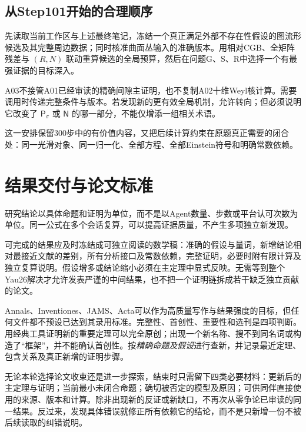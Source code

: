 \documentclass[UTF8,a4paper,11pt,fontset=fandol]{ctexart}
\numberwithin{equation}{section}
\theoremstyle{definition}
\begin{document}
\subsection{从Step101开始的合理顺序}
先读取当前工作区与上述最终笔记，冻结一个真正满足外部不存在性假设的图流形候选及其完整周边数据；同时核准曲面丛输入的准确版本。用相对CGB、全矩阵残差与 $(R,N)$ 联动重算候选的全局预算，然后在问题G、S、R中选择一个有最强证据的目标深入。

A03不接管A01已经审读的精确间隙主证明，也不复制A02十维Weyl核计算。需要调用时传递完整条件与版本。若发现新的更有效全局机制，允许转向；但必须说明它改变了 $\mathsf P_\sigma$ 或 $\mathsf N$ 的哪一部分，不能仅增添一组相关术语。

这一安排保留300步中的有价值内容，又把后续计算约束在原题真正需要的闭合处：同一光滑对象、同一归一化、全部方程、全部Einstein符号和明确常数依赖。

\section{结果交付与论文标准}
研究结论以具体命题和证明为单位，而不是以Agent数量、步数或平台认可次数为单位。同一公式在多个会话复算，可以提高证据质量，不产生多项独立新发现。

可完成的结果应及时冻结成可独立阅读的数学稿：准确的假设与量词，新增结论相对最接近文献的差别，所有分析接口及常数依赖，完整证明，必要时附有限计算及独立复算说明。假设增多或结论缩小必须在主定理中显式反映。无需等到整个Yau26解决才允许发表严谨的中间结果，也不把一个证明链拆成若干缺乏独立贡献的论文。

Annals、Inventiones、JAMS、Acta可以作为高质量写作与结果强度的目标，但任何文件都不预设已达到其录用标准。完整性、首创性、重要性和选刊是四项判断。用经典工具证明新的重要定理可以完全原创；出现一个新名称、搜不到同名词或构造了“框架”，并不能确认首创性。按\emph{精确命题及假设}进行查新，并记录最近定理、包含关系及真正新增的证明步骤。

无论本轮选择论文收束还是进一步探索，结束时只需留下四类必要材料：更新后的主定理与证明；当前最小未闭合命题；确切被否定的模型及原因；可供同伴直接使用的来源、版本和计算。除非出现新的反证或新缺口，不再次从零争论已审读的同一结果。反过来，发现具体错误就修正所有依赖它的结论，而不是只新增一份不被后续读取的纠错说明。
\end{document}
